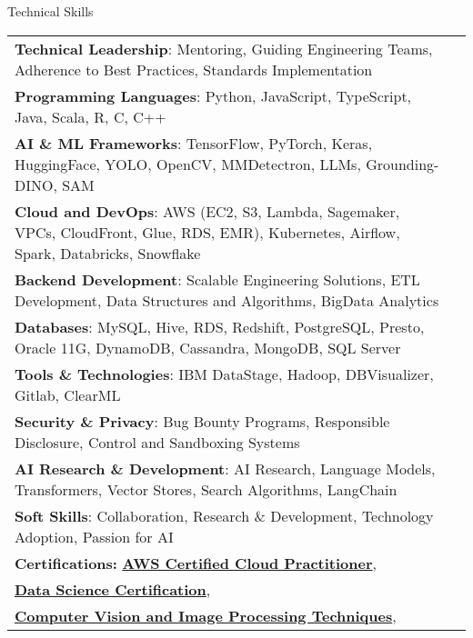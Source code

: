 \documentclass{resume} %
\begin{document}
    \begin{rSection}{Technical Skills}
        \begin{tabular}{ @{} l @{\hspace{1ex}} l }
                                \textbf{Technical Leadership}: Mentoring, Guiding Engineering Teams, Adherence to Best Practices, Standards Implementation\\
                                \textbf{Programming Languages}: Python, JavaScript, TypeScript, Java, Scala, R, C, C++\\
                                \textbf{AI \& ML Frameworks}: TensorFlow, PyTorch, Keras, HuggingFace, YOLO, OpenCV, MMDetectron, LLMs, Grounding{-}DINO, SAM\\
                                \textbf{Cloud and DevOps}: AWS (EC2, S3, Lambda, Sagemaker, VPCs, CloudFront, Glue, RDS, EMR), Kubernetes, Airflow, Spark, Databricks, Snowflake\\
                                \textbf{Backend Development}: Scalable Engineering Solutions, ETL Development, Data Structures and Algorithms, BigData Analytics\\
                                \textbf{Databases}: MySQL, Hive, RDS, Redshift, PostgreSQL, Presto, Oracle 11G, DynamoDB, Cassandra, MongoDB, SQL Server\\
                                \textbf{Tools \& Technologies}: IBM DataStage, Hadoop, DBVisualizer, Gitlab, ClearML\\
                                \textbf{Security \& Privacy}: Bug Bounty Programs, Responsible Disclosure, Control and Sandboxing Systems\\
                                \textbf{AI Research \& Development}: AI Research, Language Models, Transformers, Vector Stores, Search Algorithms, LangChain\\
                                \textbf{Soft Skills}: Collaboration, Research \& Development, Technology Adoption, Passion for AI\\
                        \textbf{Certifications:} 
                                            \href{None}{\textbf{AWS Certified Cloud Practitioner}},\\
                                            \href{None}{\textbf{Data Science Certification}},\\
                                            \href{None}{\textbf{Computer Vision and Image Processing Techniques}},\\
                                 
        \end{tabular}
    \end{rSection}
 
\end{document}
